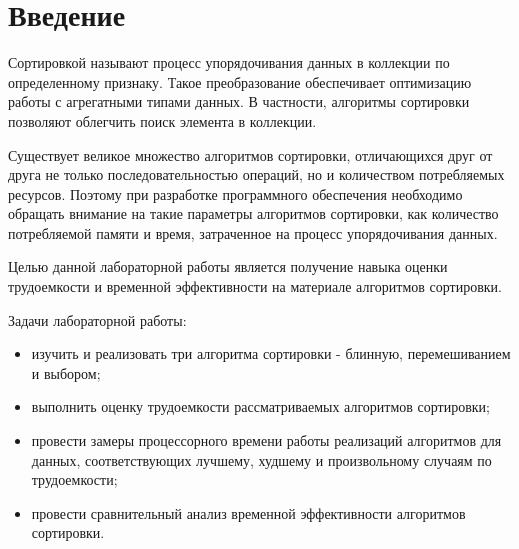 \chapter*{Введение}

Сортировкой называют процесс упорядочивания данных в коллекции по определенному признаку. Такое преобразование обеспечивает оптимизацию работы с агрегатными типами данных. В частности, алгоритмы сортировки позволяют облегчить поиск элемента в коллекции.

Существует великое множество алгоритмов сортировки, отличающихся друг от друга не только последовательностью операций, но и количеством потребляемых ресурсов. Поэтому при разработке программного обеспечения необходимо обращать внимание на такие параметры алгоритмов сортировки, как количество потребляемой памяти и время, затраченное на процесс упорядочивания данных.

Целью данной лабораторной работы является получение навыка оценки трудоемкости и временной
эффективности на материале алгоритмов сортировки.

Задачи лабораторной работы:

\begin{itemize}
	\item изучить и реализовать три алгоритма сортировки - блинную, перемешиванием и выбором;
	
	\item выполнить оценку трудоемкости рассматриваемых алгоритмов сортировки;
	
	\item провести замеры процессорного времени работы реализаций
	алгоритмов для данных, соответствующих лучшему, худшему и произвольному
	случаям по трудоемкости;
	
	\item провести сравнительный анализ временной эффективности алгоритмов сортировки.
\end{itemize}
\clearpage
